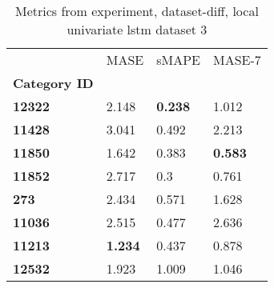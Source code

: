 \begin{table}[H]
\centering
\caption{Metrics from experiment, dataset-diff, local univariate lstm dataset 3}
\label{table:local-univariate-lstm-dataset-3-dataset-diff}
\begin{tabular}{llll}
\toprule
{} &            MASE &           sMAPE &          MASE-7 \\
\textbf{Category ID} &                 &                 &                 \\
\midrule
\textbf{12322      } &           2.148 &  \textbf{0.238} &           1.012 \\
\textbf{11428      } &           3.041 &           0.492 &           2.213 \\
\textbf{11850      } &           1.642 &           0.383 &  \textbf{0.583} \\
\textbf{11852      } &           2.717 &             0.3 &           0.761 \\
\textbf{273        } &           2.434 &           0.571 &           1.628 \\
\textbf{11036      } &           2.515 &           0.477 &           2.636 \\
\textbf{11213      } &  \textbf{1.234} &           0.437 &           0.878 \\
\textbf{12532      } &           1.923 &           1.009 &           1.046 \\
\bottomrule
\end{tabular}
\end{table}
